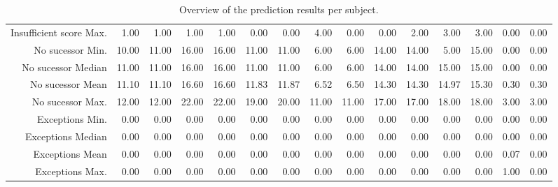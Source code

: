 \begin{table}[ht]
\begin{tabular}{rrrrrrrrrrrrrrr}
  Insufficient score Max. & 1.00 & 1.00 & 1.00 & 1.00 & 0.00 & 0.00 & 4.00 & 0.00 & 0.00 & 2.00 & 3.00 & 3.00 & 0.00 & 0.00 \\ 
  No sucessor Min. & 10.00 & 11.00 & 16.00 & 16.00 & 11.00 & 11.00 & 6.00 & 6.00 & 14.00 & 14.00 & 5.00 & 15.00 & 0.00 & 0.00 \\ 
  No sucessor Median & 11.00 & 11.00 & 16.00 & 16.00 & 11.00 & 11.00 & 6.00 & 6.00 & 14.00 & 14.00 & 15.00 & 15.00 & 0.00 & 0.00 \\ 
  No sucessor Mean & 11.10 & 11.10 & 16.60 & 16.60 & 11.83 & 11.87 & 6.52 & 6.50 & 14.30 & 14.30 & 14.97 & 15.30 & 0.30 & 0.30 \\ 
  No sucessor Max. & 12.00 & 12.00 & 22.00 & 22.00 & 19.00 & 20.00 & 11.00 & 11.00 & 17.00 & 17.00 & 18.00 & 18.00 & 3.00 & 3.00 \\ 
  Exceptions Min. & 0.00 & 0.00 & 0.00 & 0.00 & 0.00 & 0.00 & 0.00 & 0.00 & 0.00 & 0.00 & 0.00 & 0.00 & 0.00 & 0.00 \\ 
  Exceptions Median & 0.00 & 0.00 & 0.00 & 0.00 & 0.00 & 0.00 & 0.00 & 0.00 & 0.00 & 0.00 & 0.00 & 0.00 & 0.00 & 0.00 \\ 
  Exceptions Mean & 0.00 & 0.00 & 0.00 & 0.00 & 0.00 & 0.00 & 0.00 & 0.00 & 0.00 & 0.00 & 0.00 & 0.00 & 0.07 & 0.00 \\ 
  Exceptions Max. & 0.00 & 0.00 & 0.00 & 0.00 & 0.00 & 0.00 & 0.00 & 0.00 & 0.00 & 0.00 & 0.00 & 0.00 & 1.00 & 0.00 \\ 
   \hline
\end{tabular}
\caption{Overview of the prediction results per subject.} 
\label{tab:results:rq4:summary:subject:counts}
\end{table}
